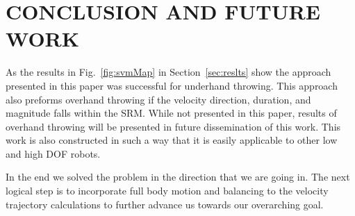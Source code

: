 \section{CONCLUSION AND FUTURE WORK}\label{sec:conc}

As the results in Fig.~\ref{fig:svmMap} in Section~\ref{sec:reslts} show the approach presented in this paper was successful for underhand throwing.  This approach also preforms overhand throwing if the velocity direction, duration, and magnitude falls within the SRM.  While not presented in this paper, results of overhand throwing will be presented in future dissemination of this work.  This work is also constructed in such a way that it is easily applicable to other low and high DOF robots.

In the end we solved the problem in the direction that we are going in.  The next logical step is to incorporate full body motion and balancing to the velocity trajectory calculations to further advance us towards our overarching goal.


